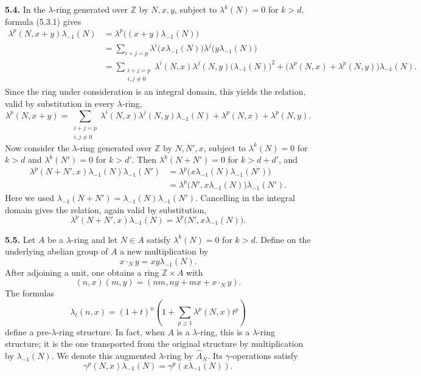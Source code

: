 \textbf{5.4.} In the \(\lambda\)-ring generated over \(\mathbb Z\) by \(N,x,y\), subject to \(\lambda^k(N)=0\) for \(k>d\), formula (5.3.1) gives
\begin{align*}
 \lambda^p(N,x+y)\lambda_{-1}(N)
 &=\lambda^p\bigl((x+y)\lambda_{-1}(N)\bigr)\\
 &=\sum_{i+j=p}
   \lambda^i\bigl(x\lambda_{-1}(N)\bigr)
   \lambda^j\bigl(y\lambda_{-1}(N)\bigr)\\
 &=\sum_{\substack{i+j=p\\ i,j\ne0}}
   \lambda^i(N,x)\lambda^j(N,y)\bigl(\lambda_{-1}(N)\bigr)^2
   +\bigl(\lambda^p(N,x)+\lambda^p(N,y)\bigr)\lambda_{-1}(N).
\end{align*}
Since the ring under consideration is an integral domain, this yields the relation, valid by substitution in every \(\lambda\)-ring,
\begin{equation}\tag{5.4.1}
 \lambda^p(N,x+y)
 =\sum_{\substack{i+j=p\\ i,j\ne0}}
   \lambda^i(N,x)\lambda^j(N,y)\lambda_{-1}(N)
   +\lambda^p(N,x)+\lambda^p(N,y).
\end{equation}
Now consider the \(\lambda\)-ring generated over \(\mathbb Z\) by \(N,N',x\), subject to \(\lambda^k(N)=0\) for \(k>d\) and \(\lambda^k(N')=0\) for \(k>d'\). Then \(\lambda^k(N+N')=0\) for \(k>d+d'\), and
\begin{align*}
 \lambda^p(N+N',x)\lambda_{-1}(N)\lambda_{-1}(N')
 &=\lambda^p\bigl(x\lambda_{-1}(N)\lambda_{-1}(N')\bigr)\\
 &=\lambda^p\bigl(N',x\lambda_{-1}(N)\bigr)\lambda_{-1}(N').
\end{align*}
Here we used \(\lambda_{-1}(N+N')=\lambda_{-1}(N)\lambda_{-1}(N')\). Cancelling in the integral domain gives the relation, again valid by substitution,
\begin{equation}\tag{5.4.2}
  \lambda^p(N+N',x)\lambda_{-1}(N)
  =\lambda^p\bigl(N',x\lambda_{-1}(N)\bigr).
\end{equation}

\textbf{5.5.} Let \(A\) be a \(\lambda\)-ring and let \(N\in A\) satisfy \(\lambda^k(N)=0\) for \(k>d\). Define on the underlying abelian group of \(A\) a new multiplication by
\[
  x\cdot_N y=xy\lambda_{-1}(N).
\]
After adjoining a unit, one obtains a ring \(\mathbb Z\times A\) with
\[
  (n,x)(m,y)=(nm,ny+mx+x\cdot_N y).
\]
The formulas
\begin{equation}\tag{5.5.1}
  \lambda_t(n,x)=(1+t)^n\left(1+
  \sum_{p\ge1}\lambda^p(N,x)t^p\right)
\end{equation}
define a pre-\(\lambda\)-ring structure. In fact, when \(A\) is a \(\lambda\)-ring, this is a \(\lambda\)-ring structure; it is the one transported from the original structure by multiplication by \(\lambda_{-1}(N)\). We denote this augmented \(\lambda\)-ring by \(\widehat A_N\). Its \(\gamma\)-operations satisfy
\begin{equation}\tag{5.5.2}
  \gamma^p(N,x)\lambda_{-1}(N)=\gamma^p(x\lambda_{-1}(N)).
\end{equation}

